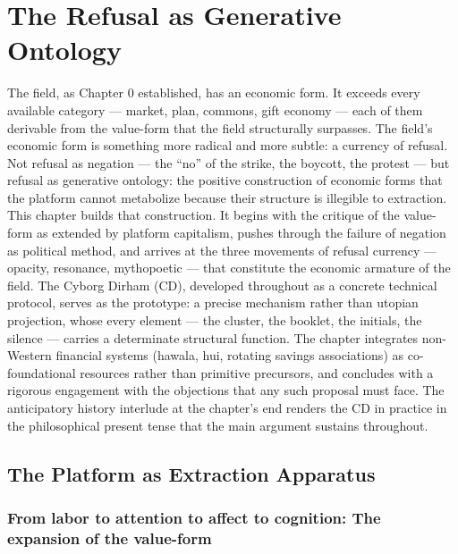 \chapter{The Refusal as Generative Ontology}
\label{ch:02}



The field, as Chapter 0 established, has an economic form. It exceeds every available category — market, plan, commons, gift economy — each of them derivable from the value-form that the field structurally surpasses. The field’s economic form is something more radical and more subtle: a currency of refusal. Not refusal as negation — the “no” of the strike, the boycott, the protest — but refusal as generative ontology: the positive construction of economic forms that the platform cannot metabolize because their structure is illegible to extraction. This chapter builds that construction. It begins with the critique of the value-form as extended by platform capitalism, pushes through the failure of negation as political method, and arrives at the three movements of refusal currency — opacity, resonance, mythopoetic — that constitute the economic armature of the field. The Cyborg Dirham (CD), developed throughout as a concrete technical protocol, serves as the prototype: a precise mechanism rather than utopian projection, whose every element — the cluster, the booklet, the initials, the silence — carries a determinate structural function. The chapter integrates non-Western financial systems (hawala, hui, rotating savings associations) as co-foundational resources rather than primitive precursors, and concludes with a rigorous engagement with the objections that any such proposal must face. The anticipatory history interlude at the chapter’s end renders the CD in practice in the philosophical present tense that the main argument sustains throughout.

\section{The Platform as Extraction Apparatus}

\subsection{From labor to attention to affect to cognition: The expansion of the value-form}

